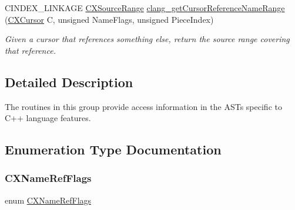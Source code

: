 \begin{DoxyCompactItemize}
C\+I\+N\+D\+E\+X\+\_\+\+L\+I\+N\+K\+A\+GE \hyperlink{structCXSourceRange}{C\+X\+Source\+Range} \hyperlink{group__CINDEX__CPP_ga8a31e7fc22e41643629394caebf4f04c}{clang\+\_\+get\+Cursor\+Reference\+Name\+Range} (\hyperlink{structCXCursor}{C\+X\+Cursor} C, unsigned Name\+Flags, unsigned Piece\+Index)
\begin{DoxyCompactList}\small\item\em Given a cursor that references something else, return the source range covering that reference. \end{DoxyCompactList}\end{DoxyCompactItemize}


\subsection{Detailed Description}
The routines in this group provide access information in the A\+S\+Ts specific to C++ language features. 

\subsection{Enumeration Type Documentation}
\mbox{\label{group__CINDEX__CPP_gab9c36c971a7241dccf6a54741b66a5ee}} 
\subsubsection{\texorpdfstring{C\+X\+Name\+Ref\+Flags}{CXNameRefFlags}}
{\footnotesize\ttfamily enum \hyperlink{group__CINDEX__CPP_gab9c36c971a7241dccf6a54741b66a5ee}{C\+X\+Name\+Ref\+Flags}}

